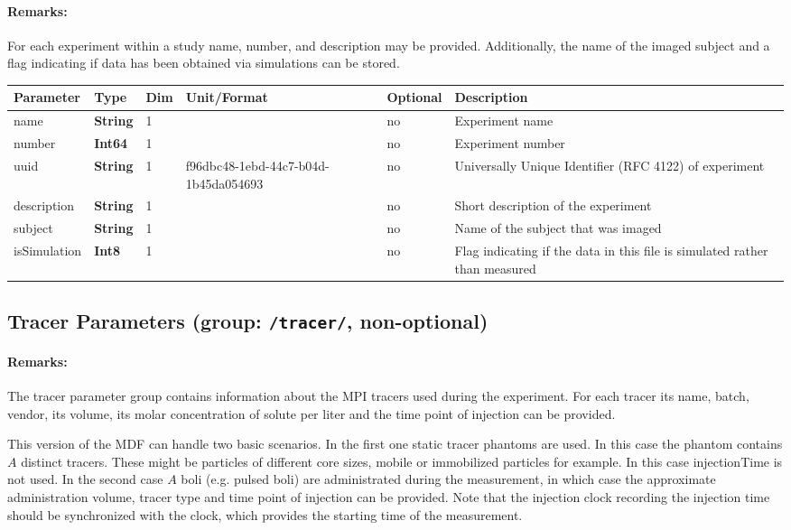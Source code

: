 \documentclass[landscape,a4paper]{article} %
\newcommand{\inl}[1]{\lstinline[columns=fixed]{#1}}
\newcommand{\inltab}[1]{{\ttfamily\bfseries\color{blue}#1}}
\newcommand{\inlvar}[1]{{\ttfamily#1}}
\begin{document}
\begin{multicols}{2}
\paragraph{Remarks:} For each experiment within a study \inlvar{name}, \inlvar{number}, and \inlvar{description} may be provided. Additionally, the name of the imaged subject and a flag indicating if data has been obtained via simulations can be stored.
\end{multicols}

\noindent \begin{tabularx}{\columnwidth}{lllllX} 
\textbf{Parameter} & \textbf{Type} & \textbf{Dim} & \textbf{Unit/Format} & \textbf{Optional} & \textbf{Description} \\ \hline 
\inlvar{name} & \inltab{String} & 1 & & no & Experiment name \\ \hline
\inlvar{number} & \inltab{Int64} & 1 & & no & Experiment number\\ \hline
\inlvar{uuid} & \inltab{String} & 1 & f96dbc48-1ebd-44c7-b04d-1b45da054693 & no & Universally Unique Identifier (RFC 4122) of experiment \\ \hline 
\inlvar{description} & \inltab{String} & 1 & & no & Short description of the experiment \\ \hline
\inlvar{subject} & \inltab{String} & 1 & & no & Name of the subject that was imaged \\ \hline 
\inlvar{isSimulation} & \inltab{Int8} & 1 & & no & Flag indicating if the data in this file is simulated rather than measured \\ \hline
\end{tabularx}


\subsection{Tracer Parameters (group: \inl{/tracer/}, non-optional)}

\begin{multicols}{2}
\paragraph{Remarks:} The tracer parameter group contains information about the MPI tracers used during the experiment. For each tracer its \inlvar{name}, \inlvar{batch}, \inlvar{vendor}, its \inlvar{volume}, its molar \inlvar{concentration} of \inlvar{solute} per liter and the time point of injection can be provided.

This version of the MDF can handle two basic scenarios. In the first one static tracer phantoms are used. In this case the phantom contains $A$ distinct tracers. These might be particles of different core sizes, mobile or immobilized particles for example. In this case \inlvar{injectionTime} is not used. In the second case $A$ boli (e.g. pulsed boli) are administrated during the measurement, in which case the approximate administration volume, tracer type and time point of injection can be provided. Note that the injection clock recording the injection time should be synchronized with the clock, which provides the starting time of the measurement.
\end{multicols}
\end{document}
